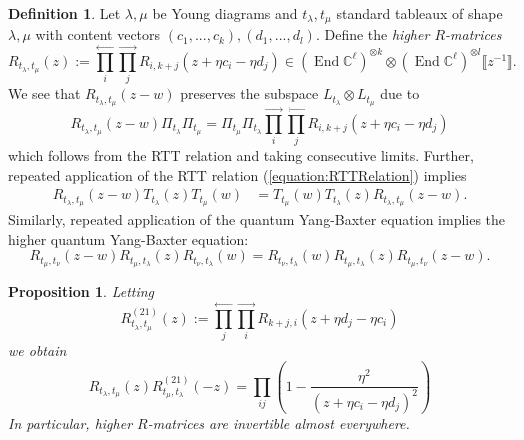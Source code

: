 \documentclass[11pt]{report}
\newtheorem{prop}[theorem]{Proposition}
\theoremstyle{definition}
\newtheorem{definition}[theorem]{Definition}
\theoremstyle{remark}
\theoremstyle{remark}
\newcommand{\End}{\operatorname{End}}
\newcommand{\C}{\mathbb{C}}
\begin{document}
\begin{definition}
Let $\lambda,\mu$ be Young diagrams and $t_\lambda,t_\mu$ standard tableaux of shape $\lambda,\mu$ with content vectors $(c_1,...,c_k),(d_1,...,d_l)$. Define the \emph{higher $R$-matrices}
\begin{equation}\label{eq:higherRMatrix}
R_{t_\lambda,t_\mu}(z) := \overset{\longleftarrow}{\prod_i} \overset{\longrightarrow}{\prod_j} R_{i,k+j}(z+\eta c_i - \eta d_j) \in (\End \C^\ell)^{\otimes k} \otimes (\End \C^\ell)^{\otimes l}\llbracket z^{-1} \rrbracket.
\end{equation}
We see that $R_{t_\lambda,t_\mu}(z-w)$ preserves the subspace $L_{t_\lambda} \otimes L_{t_\mu}$ due to
\begin{equation*}
R_{t_\lambda,t_\mu}(z-w) \Pi_{t_\lambda} \Pi_{t_\mu} = \Pi_{t_\mu} \Pi_{t_\lambda} \overset{\longrightarrow}{\prod_i} \overset{\longleftarrow}{\prod_j} R_{i,k+j}(z+\eta c_i - \eta d_j)
\end{equation*}
which follows from the RTT relation and taking consecutive limits.
Further, repeated application of the RTT relation (\ref{equation:RTTRelation}) implies
\begin{align*}
R_{t_\lambda,t_\mu}(z-w) T_{t_\lambda}(z) T_{t_\mu}(w) &= T_{t_\mu}(w) T_{t_\lambda}(z) R_{t_\lambda,t_\mu}(z-w).
\end{align*}
Similarly, repeated application of the quantum Yang-Baxter equation implies the higher quantum Yang-Baxter equation:
\begin{equation*}
R_{t_\mu,t_\nu}(z-w) R_{t_\mu,t_\lambda}(z) R_{t_\nu,t_\lambda}(w) =  R_{t_\nu,t_\lambda}(w) R_{t_\mu,t_\lambda}(z) R_{t_\mu,t_\nu}(z-w).
\end{equation*}
\end{definition}

\begin{prop}
Letting
\begin{equation*}
R_{t_\lambda,t_\mu}^{(21)}(z) := \overset{\longleftarrow}{\prod_j} \overset{\longrightarrow}{\prod_i} R_{k+j,i}(z+\eta d_j - \eta c_i)
\end{equation*}
we obtain
\begin{equation*}
R_{t_\lambda,t_\mu}(z) R_{t_\mu,t_\lambda}^{(21)}(-z) = \prod_{ij} \left( 1 - \frac{\eta^2}{(z+\eta c_i-\eta d_j)^2}\right)
\end{equation*}
In particular, higher $R$-matrices are invertible almost everywhere.
\end{prop}
\end{document}
